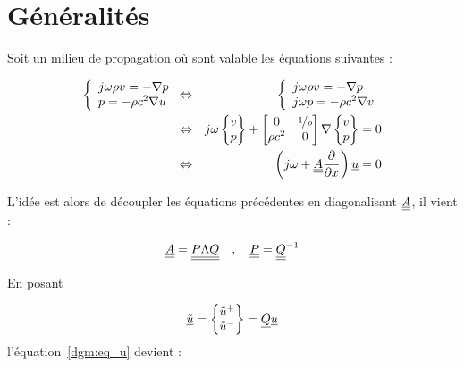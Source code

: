 

\section{Généralités}

Soit un milieu de propagation où sont valable les équations suivantes :

\begin{eqnarray}
    \left\{\begin{array}{l}
        j\omega\rho v = -\nabla p\\
        p = -\rho c^2 \nabla u
    \end{array}\right.
    & \Leftrightarrow &
    \left\{\begin{array}{l}
        j\omega\rho v = -\nabla p\\
        j\omega p = -\rho c^2 \nabla v
    \end{array}\right.
    \notag\\ & \Leftrightarrow &
    j\omega \begin{Bmatrix}v\\p\end{Bmatrix} + 
    \begin{bmatrix}
        0 & \nicefrac{1}{\rho}\\
        \rho c^2 & 0
    \end{bmatrix}
    \nabla \begin{Bmatrix}v\\p\end{Bmatrix} = 0
    \notag\\ & \Leftrightarrow &
        \left(j\omega + \underline{\underline{A}}\frac{\partial}{\partial x}\right) \underline{u} = 0 \label{dgm:eq_u}
\end{eqnarray}

L'idée est alors de découpler les équations précédentes en diagonalisant $\underline{\underline{A}}$, il vient :

\begin{equation*}
    \underline{\underline{A}} = \underline{\underline{P\Lambda Q}} \quad,\quad \underline{\underline{P}} = \underline{\underline{Q}}^{-1}
\end{equation*}

En posant

\begin{equation}
    \underline{\tilde{u}} = \begin{Bmatrix}\tilde{u}^+\\\tilde{u}^-\end{Bmatrix} = \underline{Q}\underline{u}\label{dgm:utilde}
\end{equation}
l'équation~\eqref{dgm:eq_u} devient :

